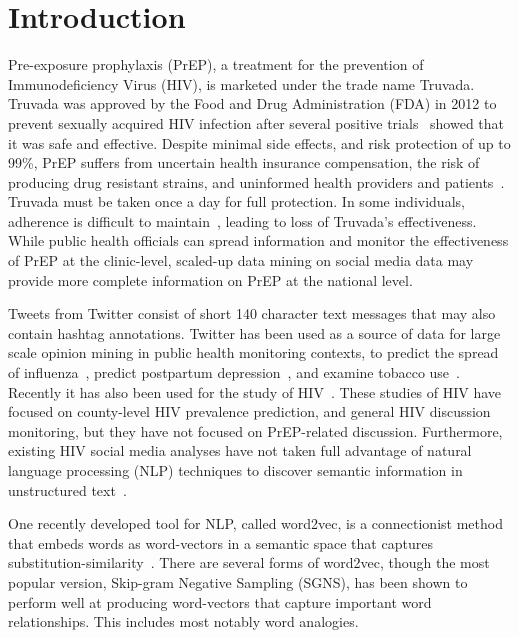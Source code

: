\documentclass{sig-alternate-05-2015}
\begin{document}


%
%

%
%
\printccsdesc



\section{Introduction}
Pre-exposure prophylaxis (PrEP), a treatment for the prevention of Immunodeficiency Virus (HIV), is marketed under the trade name Truvada. Truvada was approved by the Food and Drug Administration (FDA) in 2012 to prevent sexually acquired HIV infection after several positive trials~\cite{grant2010preexposure,thigpen2012antiretroviral} showed that it was safe and effective. Despite minimal side effects, and risk protection of up to 99\%, PrEP suffers from uncertain health insurance compensation, the risk of producing drug resistant strains, and uninformed health providers and patients~\cite{liu2014early}. Truvada must be taken once a day for full protection. In some individuals, adherence is difficult to maintain~\cite{van2012unraveling}, leading to loss of Truvada's effectiveness. While public health officials can spread information and monitor the effectiveness of PrEP at the clinic-level, scaled-up data mining on social media data may provide more complete information on PrEP at the national level.

Tweets from Twitter consist of short 140 character text messages that may also contain hashtag annotations. Twitter has been used as a source of data for large scale opinion mining in public health monitoring contexts, to predict the spread of influenza~\cite{aramaki2011twitter}, predict postpartum depression~\cite{de2013predicting}, and examine tobacco use~\cite{myslin2013using}. Recently it has also been used for the study of HIV~\cite{young2014methods,young2013online}. These studies of HIV have focused on county-level HIV prevalence prediction, and general HIV discussion monitoring, but they have not focused on PrEP-related discussion. Furthermore, existing HIV social media analyses have not taken full advantage of natural language processing (NLP) techniques to discover semantic information in unstructured text~\cite{young2015big}.

One recently developed tool for NLP, called word2vec, is a connectionist method that embeds words as word-vectors in a semantic space that captures substitution-similarity~\cite{mikolov2013efficient}. There are several forms of word2vec, though the most popular version, Skip-gram Negative Sampling (SGNS), has been shown to perform well at producing word-vectors that capture important word relationships. This includes most notably word analogies. 
\end{document}
